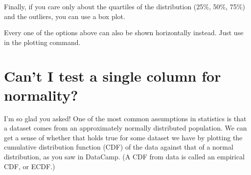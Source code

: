 \documentclass[letterpaper,10pt,english]{sphinxmanual}
\begin{document}
\noindent{}

Finally, if you care only about the quartiles of the distribution (25\%, 50\%, 75\%) and the outliers, you can use a box plot.

\begin{sphinxVerbatim}[commandchars=\\\{\}]
   
  
\end{sphinxVerbatim}

\noindent{}

Every one of the options above can also be shown horizontally instead.  Just use  in the plotting command.

\begin{sphinxVerbatim}[commandchars=\\\{\}]
    
  
\end{sphinxVerbatim}

\noindent{}


\section{Can’t I test a single column for normality?}
\label{\detokenize{chapter-10-visualization:can-t-i-test-a-single-column-for-normality}}
I’m so glad you asked!  One of the most common assumptions in statistics is that a dataset comes from an approximately normally distributed population.  We can get a sense of whether that holds true for some dataset we have by plotting the cumulative distribution function (CDF) of the data against that of a normal distribution, as you saw in DataCamp.  (A CDF from data is called an empirical CDF, or ECDF.)
\end{document}
